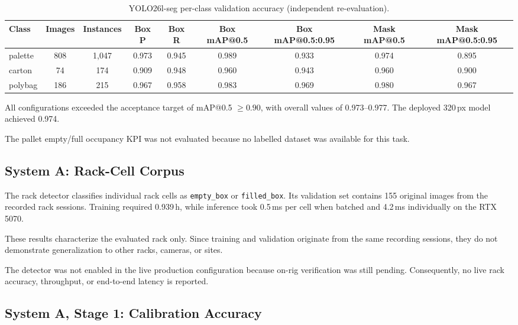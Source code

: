 \documentclass[9pt,a4paper,twocolumn]{rho-class/rho}
\begin{document}
\begin{table}[tbp]
    \caption{YOLO26l-seg per-class validation accuracy (independent re-evaluation).}
    \label{tab:t2}
    \centering
    \small
    \setlength{\tabcolsep}{4pt}
    \begin{tabular}{lcccccccc}
    \toprule
    \textbf{Class} & \textbf{Images} & \textbf{Instances} & \textbf{Box P} & \textbf{Box R} & \textbf{Box mAP@0.5} & \textbf{Box mAP@0.5:0.95} & \textbf{Mask mAP@0.5} & \textbf{Mask mAP@0.5:0.95} \\
    \midrule
    palette & 808 & 1{,}047 & 0.973 & 0.945 & 0.989 & 0.933 & 0.974 & 0.895 \\
    carton & 74 & 174 & 0.909 & 0.948 & 0.960 & 0.943 & 0.960 & 0.900 \\
    polybag & 186 & 215 & 0.967 & 0.958 & 0.983 & 0.969 & 0.980 & 0.967 \\
    \bottomrule
    \end{tabular}
\end{table}

All configurations exceeded the acceptance target of mAP@0.5 $\geq 0.90$, with overall values of 0.973--0.977. The deployed 320\,px model achieved 0.974.

The pallet empty/full occupancy KPI was not evaluated because no labelled dataset was available for this task.

\subsection{System A: Rack-Cell Corpus}

The rack detector classifies individual rack cells as \texttt{empty\_box} or \texttt{filled\_box}. Its validation set contains 155 original images from the recorded rack sessions. Training required 0.939\,h, while inference took 0.5\,ms per cell when batched and 4.2\,ms individually on the RTX 5070.

These results characterize the evaluated rack only. Since training and validation originate from the same recording sessions, they do not demonstrate generalization to other racks, cameras, or sites.

The detector was not enabled in the live production configuration because on-rig verification was still pending. Consequently, no live rack accuracy, throughput, or end-to-end latency is reported.

\subsection{System A, Stage 1: Calibration Accuracy}
\end{document}
